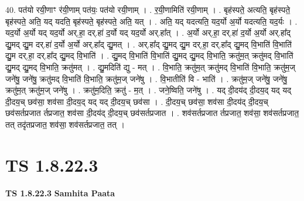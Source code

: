 \documentclass[17pt]{extarticle}
\begin{document}
40. पत॑यो रयी॒णाꣳ र॑यी॒णाम् पत॑यः॒ पत॑यो रयी॒णाम् । . र॒यी॒णामिति॑ रयी॒णाम् । . बृह॑स्पते॒ अत्यति॒ बृह॑स्पते॒ बृह॑स्पते॒ अति॒ यद् यदति॒ बृह॑स्पते॒ बृह॑स्पते॒ अति॒ यत् । . अति॒ यद् यदत्यति॒ यद॒र्यो अ॒र्यो यदत्यति॒ यद॒र्यः । . यद॒र्यो अ॒र्यो यद् यद॒र्यो अर्.हा॒ दर्.हा॑ द॒र्यो यद् यद॒र्यो अर्.हा᳚त् । . अ॒र्यो अर्.हा॒ दर्.हा॑ द॒र्यो अ॒र्यो अर्.हा᳚द् द्यु॒मद् द्यु॒म दर्.हा॑ द॒र्यो अ॒र्यो अर्.हा᳚द् द्यु॒मत् । . अर्.हा᳚द् द्यु॒मद् द्यु॒म दर्.हा॒ दर्.हा᳚द् द्यु॒मद् वि॒भाति॑ वि॒भाति॑ द्यु॒म दर्.हा॒ दर्.हा᳚द् द्यु॒मद् वि॒भाति॑ । . द्यु॒मद् वि॒भाति॑ वि॒भाति॑ द्यु॒मद् द्यु॒मद् वि॒भाति॒ क्रतु॑म॒त् क्रतु॑मद् वि॒भाति॑ द्यु॒मद् द्यु॒मद् वि॒भाति॒ क्रतु॑मत् । . द्यु॒मदिति॑ द्यु - मत् । . वि॒भाति॒ क्रतु॑म॒त् क्रतु॑मद् वि॒भाति॑ वि॒भाति॒ क्रतु॑म॒ज् जने॑षु॒ जने॑षु॒ क्रतु॑मद् वि॒भाति॑ वि॒भाति॒ क्रतु॑म॒ज् जने॑षु । . वि॒भातीति॑ वि - भाति॑ । . क्रतु॑म॒ज् जने॑षु॒ जने॑षु॒ क्रतु॑म॒त् क्रतु॑म॒ज् जने॑षु । . क्रतु॑म॒दिति॒ क्रतु॑ - म॒त् । . जने॒ष्विति॒ जने॑षु । . यद् दी॒दय॑द् दी॒दय॒द् यद् यद् दी॒दय॒च् छव॑सा॒ शव॑सा दी॒दय॒द् यद् यद् दी॒दय॒च् छव॑सा । . दी॒दय॒च् छव॑सा॒ शव॑सा दी॒दय॑द् दी॒दय॒च् छव॑सर्तप्रजात र्तप्रजात॒ शव॑सा दी॒दय॑द् दी॒दय॒च् छव॑सर्तप्रजात । . शव॑सर्तप्रजात र्तप्रजात॒ शव॑सा॒ शव॑सर्तप्रजात॒ तत् तदृ॑तप्रजात॒ शव॑सा॒ शव॑सर्तप्रजात॒ तत् । \newline
\pagebreak
{}

\section{ TS 1.8.22.3 }

\textbf{TS 1.8.22.3 } \newline
\textbf{Samhita Paata} \newline
\end{document}
